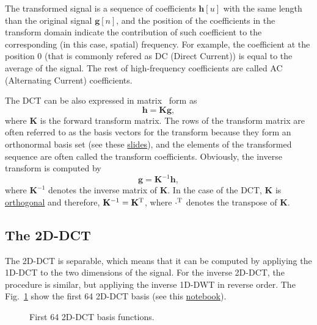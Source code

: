 The transformed signal is a sequence of coefficients ${\mathbf h}[u]$
with the same length than the original signal ${\mathbf g}[n]$, and the
position of the coefficients in the transform domain indicate the
contribution of such coefficient to the corresponding (in this case,
spatial) frequency. For example, the coefficient at the position 0
(that is commonly refered as DC (Direct Current)) is equal to the
average of the signal. The rest of high-frequency coefficients are
called AC (Alternating Current) coefficients.

The DCT can be also expressed in matrix~\cite{sayood2017introduction}
form as
\begin{equation}
  {\mathbf h} = {\mathbf K}{\mathbf g},
\end{equation}
where ${\mathbf K}$ is the forward transform matrix. The rows of the
transform matrix are often referred to as the basis vectors for the
transform because they form an orthonormal basis set (see these
\href{https://cseweb.ucsd.edu/classes/fa17/cse166-a/lec13.pdf}{slides}),
and the elements of the transformed sequence are often called the
transform coefficients. Obviously, the inverse transform is computed
by
\begin{equation}
  {\mathbf g} = {\mathbf K}^{-1}{\mathbf h},
\end{equation}
where ${\mathbf K}^{-1}$ denotes the inverse matrix of ${\mathbf
  K}$. In the case of the DCT, ${\mathbf K}$ is
\href{https://en.wikipedia.org/wiki/Orthogonal_matrix}{orthogonal} and
therefore, ${\mathbf K}^{-1}={\mathbf K}^{\text T}$, where
$\cdot^{\text T}$ denotes the transpose of ${\mathbf K}$.

\subsection{The 2D-DCT}

The 2D-DCT is separable, which means that it can be computed by
appliying the 1D-DCT to the two dimensions of the signal. For the
inverse 2D-DCT, the procedure is similar, but appliying the inverse
1D-DWT in reverse order. The Fig.~\ref{fig:2D-DCT_basis} show the
first 64 2D-DCT basis (see this
\href{https://github.com/Sistemas-Multimedia/Sistemas-Multimedia.github.io/blob/master/milestones/07-DCT/DCT_basis.ipynb}{notebook}).

\begin{figure}
  \centering
  \caption{First 64 2D-DCT basis functions.}
  \label{fig:2D-DCT_basis}
\end{figure}

